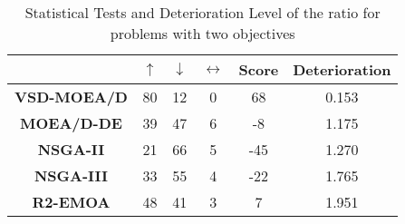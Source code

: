 \begin{table*}[t]
\centering
\caption{Statistical Tests and Deterioration Level of the \HV{} ratio for problems with two objectives}
\label{tab:Tests_HV_2obj}
\begin{tabular}{c|c|c|c|c|c|}
\cline{2-6}
 & \textbf{$\uparrow$} & \textbf{$\downarrow$} & \textbf{$\leftrightarrow$} & \textbf{Score} & \textbf{Deterioration} \\ \hline
\multicolumn{1}{|c|}{\textbf{VSD-MOEA/D}} & 80 & 12 & 0 & 68 & 0.153 \\ \hline
\multicolumn{1}{|c|}{\textbf{MOEA/D-DE}} & 39 & 47 & 6 & -8 & 1.175 \\ \hline
\multicolumn{1}{|c|}{\textbf{NSGA-II}} & 21 & 66 & 5 & -45 & 1.270 \\ \hline
\multicolumn{1}{|c|}{\textbf{NSGA-III}} & 33 & 55 & 4 & -22 & 1.765 \\ \hline
\multicolumn{1}{|c|}{\textbf{R2-EMOA}} & 48 & 41 & 3 & 7 & 1.951 \\ \hline
\end{tabular}
\end{table*}




